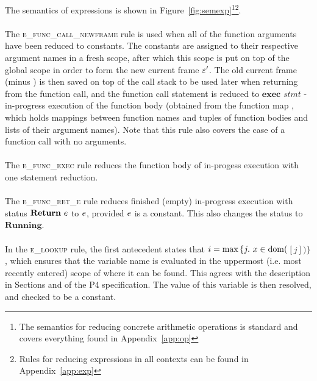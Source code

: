 \documentclass[UTF8]{article}
\begin{document}
The semantics of expressions is shown in Figure~\ref{fig:semexp}\footnote{The semantics for reducing concrete arithmetic operations is standard and covers everything found in Appendix~\ref{app:op}}\footnote{Rules for reducing expressions in all contexts can be found in Appendix~\ref{app:exp}}.
\\~\\
The \textsc{e\_func\_call\_newframe} rule is used when all of the function arguments have been reduced to constants. The constants are assigned to their respective argument names in a fresh scope, after which this scope is put on top of the global scope \gscope{} in order to form the new current frame $\varepsilon '$. The old current frame \currsf{} (minus \gscope{}) is then saved on top of the call stack \cstack{} to be used later when returning from the function call, and the function call statement is reduced to $\mathbf{exec} \,\, \mathit{stmt}$ - in-progress execution of the function body \stmt{} (obtained from the function map \fmap{}, which holds mappings between function names \fn{} and tuples of function bodies and lists of their argument names). Note that this rule also covers the case of a function call with no arguments.
\\~\\
The \textsc{e\_func\_exec} rule reduces the function body of in-progess execution with one statement reduction.
\\~\\
The \textsc{e\_func\_ret\_e} rule reduces finished (empty) in-progress execution with status $\mathbf{Return} \,\, e$ to $e$, provided $e$ is a constant. This also changes the status to $\mathbf{Running}$.
\\~\\
In the \textsc{e\_lookup} rule, the first antecedent states that $i = \mathrm{max} \, \{ j . \,\, x  \in \mathrm{dom} ( $\currsf$ [j] ) \} $, which ensures that the variable name \vn{} is evaluated in the uppermost (i.e. most recently entered) scope of \currsf{} where it can be found. This agrees with the description in Sections  and  of the P4 specification. The value of this variable is then resolved, and checked to be a constant.

\newpage
\end{document}
